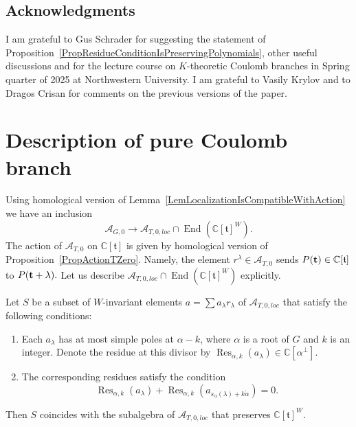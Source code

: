 \documentclass{article}
\renewcommand{\C}{\mathbb{C}}
\newcommand{\mf}{\mathfrak}
\newcommand{\mc}[1]{\mathcal{#1}}
\newcommand{\End}{\operatorname{End}}
\newcommand{\Res}{\operatorname{Res}}
\newcommand{\boldt}{\bold t}
\begin{document}
\subsection*{Acknowledgments}
I am grateful to Gus Schrader for suggesting the statement of Proposition~\ref{PropResidueConditionIsPreservingPolynomials}, other useful discussions and for the lecture course on $K$-theoretic Coulomb branches in Spring quarter of 2025 at Northwestern University. I am grateful to Vasily Krylov and to Dragos Crisan for comments on the previous versions of the paper.


\section{Description of pure Coulomb branch}
\label{SecPureResidues}
Using homological version of Lemma~\ref{LemLocalizationIsCompatibleWithAction} we have an inclusion \[\mc{A}_{G,0}\to \mc{A}_{T,0,loc}\cap \End(\C[\mf{t}]^W).\] The action of $\mc{A}_{T,0}$ on $\C[\mf{t}]$ is given by homological version of Proposition~\ref{PropActionTZero}. Namely, the element $r^{\lambda}\in \mc{A}_{T,0}$ sends $P(\boldt)\in \C[\mf{t}]$ to $P(\boldt+\lambda).$ Let us describe $\mc{A}_{T,0,loc}\cap \End(\C[\mf{t}]^W)$ explicitly.
\begin{prop}
\label{PropResidueConditionIsPreservingPolynomials}
Let $S$ be a subset of $W$-invariant elements $a=\sum a_{\lambda} r_{\lambda}$ of $\mc{A}_{T,0,loc}$ that satisfy the following conditions: 
\begin{enumerate}
\item
Each $a_{\lambda}$ has at most simple poles at $\alpha-k$, where $\alpha$ is a root of $G$ and $k$ is an integer. Denote the residue at this divisor by $\Res_{\alpha,k}(a_{\lambda})\in \C[\alpha^{\perp}]$.
\item
The corresponding residues satisfy the condition \[\Res_{\alpha,k}(a_{\lambda})+\Res_{\alpha,k}(a_{s_{\alpha}(\lambda)+k\check{\alpha}})=0.\]
\end{enumerate}
Then $S$ coincides with the subalgebra of $\mc{A}_{T,0,loc}$ that preserves $\C[\mf{t}]^W$.
\end{prop}
\end{document}
